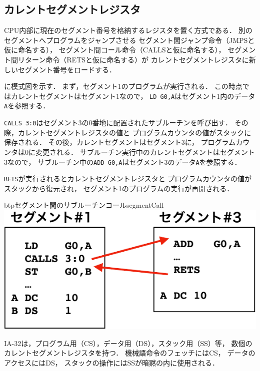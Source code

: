 \subsection{カレントセグメントレジスタ}
CPU内部に現在のセグメント番号を格納するレジスタを置く方式である．
別のセグメントへプログラムをジャンプさせる
セグメント間ジャンプ命令（JMPSと仮に命名する），
セグメント間コール命令（CALLSと仮に命名する），
セグメント間リターン命令（RETSと仮に命名する）が
カレントセグメントレジスタに新しいセグメント番号をロードする．

に模式図を示す．
まず，セグメント1のプログラムが実行される．
この時点ではカレントセグメントはセグメント1なので，
\texttt{LD G0,A}はセグメント1内のデータ\texttt{A}を参照する．

\texttt{CALLS 3:0}はセグメント3の0番地に配置されたサブルーチンを呼び出す．
その際，カレントセグメントレジスタの値と
プログラムカウンタの値がスタックに保存される．
その後，カレントセグメントはセグメント3に，
プログラムカウンタは0に変更される．
サブルーチン実行中のカレントセグメントはセグメント3なので，
サブルーチン中の\texttt{ADD G0,A}はセグメント3のデータ\texttt{A}を参照する．

\texttt{RETS}が実行されるとカレントセグメントレジスタと
プログラムカウンタの値がスタックから復元され，
セグメント1のプログラムの実行が再開される．

\begin{myfig}{btp}{セグメント間のサブルーチンコール}{segmentCall}
  \includegraphics[scale=0.66]{Fig/segmentCall-crop.pdf}
\end{myfig}

IA-32は，プログラム用（CS），データ用（DS），スタック用（SS）等，
数個のカレントセグメントレジスタを持つ．
機械語命令のフェッチにはCS，
データのアクセスにはDS，
スタックの操作にはSSが暗黙の内に使用される\cite{ia32SegmentReg}．

